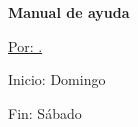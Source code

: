 \documentclass[a4paper, 12pt]{article}
\begin{document}
\begin{titlepage}
		
		\hfill
		\begin{minipage}{8cm}
			\vspace{5cm}
			\begin{flushright}
				\begin{spacing}{3}
					{\fontsize{40}{50} \selectfont \color{colorRojo1} \textbf{\titulo}}
				\end{spacing}
			\end{flushright}
		\end{minipage}
		\vfill
		\hfill
		\begin{minipage}{10cm}
			\begin{flushright} \color{colorGris1}
				\begin{spacing}{2}
					
					\color{colorAzul1} \textbf{Manual de ayuda}
					
					\color{colorAzul1} \underline {Por: \autor.}
					
					Inicio: Domingo \fechainicio
					
					Fin: Sábado \fechafinal
				\end{spacing}
			\end{flushright}
		\end{minipage}
		
	\end{titlepage}
	
	\newpage
	\color{colorAzul1} \tableofcontents
	\newpage
	
\end{document}
